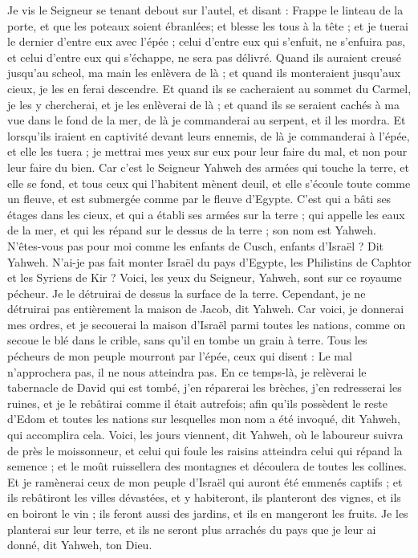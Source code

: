 \begin{multicols}{2}
\VerseOne{}Je vis le Seigneur se tenant debout sur l’autel, et disant  : Frappe le linteau de la porte, et que les poteaux soient ébranlées; et blesse les tous à la tête ; et je tuerai le dernier d’entre eux avec l’épée ; celui d’entre eux qui s’enfuit, ne s’enfuira pas, et celui d’entre eux qui s’échappe, ne sera pas délivré.
Quand ils auraient creusé jusqu'au scheol, ma main les enlèvera de là ; et quand ils monteraient jusqu'aux cieux, je les en ferai descendre.
Et quand  ils se cacheraient au sommet du Carmel, je les y chercherai, et je les enlèverai de là ; et quand  ils se seraient cachés à ma vue dans le fond de la mer, de là je commanderai au serpent, et il les mordra.
Et lorsqu'ils iraient en captivité devant leurs ennemis, de là je commanderai à l’épée, et elle les tuera ;  je mettrai mes yeux sur eux pour leur faire du mal, et non pour leur faire du bien.
Car c'est le Seigneur Yahweh des armées qui touche la terre, et elle se fond, et tous ceux qui l'habitent mènent deuil, et elle s'écoule toute comme un fleuve, et est submergée comme par le fleuve d'Egypte. 
C'est qui a bâti ses étages dans les cieux, et qui a établi ses armées sur la terre ; qui appelle les eaux de la mer, et qui les répand sur le dessus de la terre ; son nom est Yahweh. 
N'êtes-vous pas pour moi comme les enfants de Cusch, enfants d'Israël ? Dit Yahweh. N'ai-je pas fait monter Israël du pays d'Egypte, les Philistins de Caphtor et les Syriens de Kir ?
Voici, les yeux du Seigneur, Yahweh, sont sur ce royaume pécheur. Je le détruirai de dessus la surface de la terre. Cependant, je ne détruirai pas entièrement la maison de Jacob, dit Yahweh.
Car voici, je donnerai mes ordres, et je secouerai la maison d'Israël parmi toutes les nations, comme on secoue le blé dans le crible, sans qu'il en tombe un grain à terre.
Tous les pécheurs de mon peuple mourront par l'épée, ceux qui disent : Le mal n'approchera pas, il ne nous atteindra pas.
En ce temps-là, je relèverai le tabernacle de David qui est tombé, j'en réparerai les brèches, j'en redresserai les ruines, et je le rebâtirai comme il était autrefois;
afin qu'ils possèdent le reste d'Edom et toutes les nations sur lesquelles mon nom a été invoqué, dit Yahweh, qui accomplira cela.
Voici, les jours viennent, dit Yahweh, où le laboureur suivra de près le moissonneur, et celui qui foule les raisins atteindra celui qui répand la semence ; et le moût ruissellera des montagnes et découlera de toutes les collines.
Et je ramènerai ceux de mon peuple d'Israël qui auront été emmenés captifs ; et ils rebâtiront les villes dévastées, et y habiteront, ils planteront des vignes, et ils en boiront le vin ; ils feront aussi des jardins, et ils en mangeront les fruits.
Je les planterai sur leur terre, et ils ne seront plus arrachés du pays que je leur ai donné, dit Yahweh, ton Dieu.
\PPE{}
\end{multicols}
